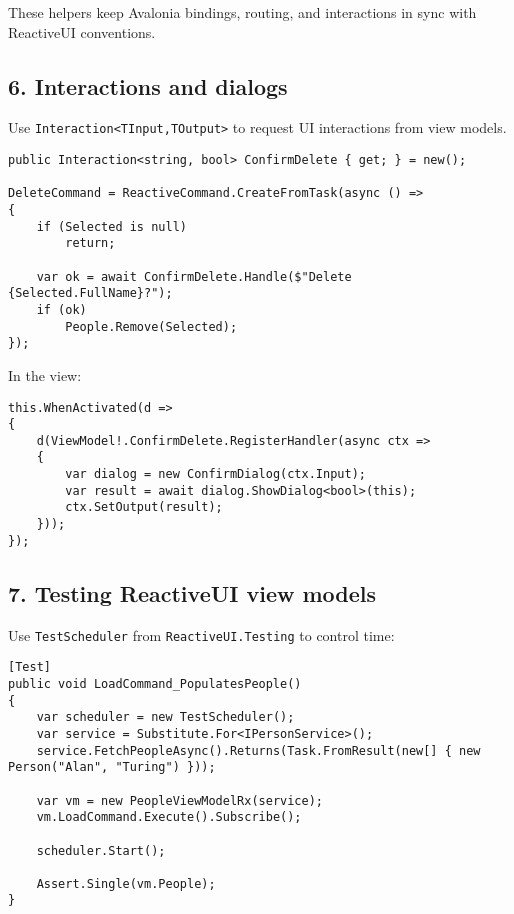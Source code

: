 These helpers keep Avalonia bindings, routing, and interactions in sync
with ReactiveUI conventions.

\subsection{6. Interactions and dialogs}\label{interactions-and-dialogs}

Use \passthrough{\lstinline!Interaction<TInput,TOutput>!} to request UI
interactions from view models.

\begin{lstlisting}
public Interaction<string, bool> ConfirmDelete { get; } = new();

DeleteCommand = ReactiveCommand.CreateFromTask(async () =>
{
    if (Selected is null)
        return;

    var ok = await ConfirmDelete.Handle($"Delete {Selected.FullName}?");
    if (ok)
        People.Remove(Selected);
});
\end{lstlisting}

In the view:

\begin{lstlisting}
this.WhenActivated(d =>
{
    d(ViewModel!.ConfirmDelete.RegisterHandler(async ctx =>
    {
        var dialog = new ConfirmDialog(ctx.Input);
        var result = await dialog.ShowDialog<bool>(this);
        ctx.SetOutput(result);
    }));
});
\end{lstlisting}

\subsection{7. Testing ReactiveUI view
models}\label{testing-reactiveui-view-models}

Use \passthrough{\lstinline!TestScheduler!} from
\passthrough{\lstinline!ReactiveUI.Testing!} to control time:

\begin{lstlisting}
[Test]
public void LoadCommand_PopulatesPeople()
{
    var scheduler = new TestScheduler();
    var service = Substitute.For<IPersonService>();
    service.FetchPeopleAsync().Returns(Task.FromResult(new[] { new Person("Alan", "Turing") }));

    var vm = new PeopleViewModelRx(service);
    vm.LoadCommand.Execute().Subscribe();

    scheduler.Start();

    Assert.Single(vm.People);
}
\end{lstlisting}


